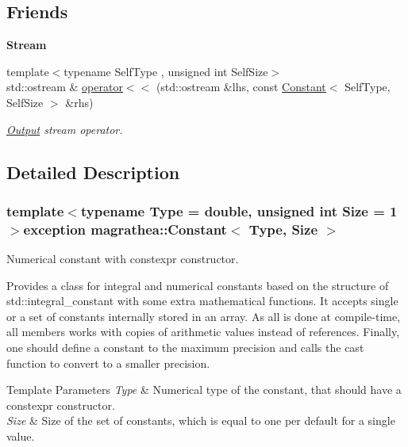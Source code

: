 \subsection*{Friends}
\begin{Indent}{\bf Stream}\par
\begin{DoxyCompactItemize}
\item 
{\footnotesize template$<$typename Self\-Type , unsigned int Self\-Size$>$ }\\std\-::ostream \& \hyperlink{exceptionmagrathea_1_1Constant_aaa3327f78f80cda983b50f4bd1e27bfc}{operator$<$$<$} (std\-::ostream \&lhs, const \hyperlink{exceptionmagrathea_1_1Constant}{Constant}$<$ Self\-Type, Self\-Size $>$ \&rhs)
\begin{DoxyCompactList}\small\item\em \hyperlink{exceptionOutput}{Output} stream operator. \end{DoxyCompactList}\end{DoxyCompactItemize}
\end{Indent}


\subsection{Detailed Description}
\subsubsection*{template$<$typename Type = double, unsigned int Size = 1$>$exception magrathea\-::\-Constant$<$ Type, Size $>$}

Numerical constant with constexpr constructor. 

Provides a class for integral and numerical constants based on the structure of {\ttfamily std\-::integral\-\_\-constant} with some extra mathematical functions. It accepts single or a set of constants internally stored in an array. As all is done at compile-\/time, all members works with copies of arithmetic values instead of references. Finally, one should define a constant to the maximum precision and calls the cast function to convert to a smaller precision. 
\begin{DoxyTemplParams}{Template Parameters}
{\em Type} & Numerical type of the constant, that should have a constexpr constructor. \\
\hline
{\em Size} & Size of the set of constants, which is equal to one per default for a single value. \\
\hline
\end{DoxyTemplParams}


